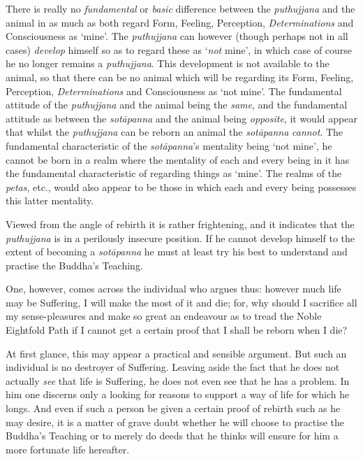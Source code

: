 There is really no \emph{fundamental} or \emph{basic} difference between the \textit{puthujjana} and the animal in as much as both regard Form, Feeling, Perception, \textit{Determinations} and Consciousness as `mine'. The \textit{puthujjana} can however (though perhaps not in all cases) \emph{develop} himself so as to regard these as `\emph{not} mine', in which case of course he no longer remains a \textit{puthujjana}. This development is not available to the animal, so that there can be no animal which will be regarding its Form, Feeling, Perception, \textit{Determinations} and Consciousness as `not mine'. The fundamental attitude of the \textit{puthujjana} and the animal being the \emph{same}, and the fundamental attitude as between the \textit{sotāpanna} and the animal being \emph{opposite}, it would appear that whilst the \textit{puthujjana} can be reborn an animal the \textit{sotāpanna} \emph{cannot}. The fundamental characteristic of the \textit{sotāpanna}'s mentality being `not mine', he cannot be born in a realm where the mentality of each and every being in it has the fundamental characteristic of regarding things as `mine'. The realms of the \textit{petas}, etc., would also appear to be those in which each and every being possesses this latter mentality.

Viewed from the angle of rebirth it is rather frightening, and it indicates that the \textit{puthujjana} is in a perilously insecure position. If he cannot develop himself to the extent of becoming a \textit{sotāpanna} he must at least try his best to understand and practise the Buddha's Teaching.

One, however, comes across the individual who argues thus: however much life may be Suffering, I will make the most of it and die; for, why should I sacrifice all my sense-pleasures and make so great an endeavour as to tread the Noble Eightfold Path if I cannot get a certain proof that I shall be reborn when I die?

At first glance, this may appear a practical and sensible argument. But such an individual is no destroyer of Suffering. Leaving aside the fact that he does not actually \emph{see} that life is Suffering, he does not even see that he has a problem. In him one discerns only a looking for reasons to support a way of life for which he longs. And even if such a person be given a certain proof of rebirth such as he may desire, it is a matter of grave doubt whether he will choose to practise the Buddha's Teaching or to merely do deeds that he thinks will ensure for him a more fortunate life hereafter.

